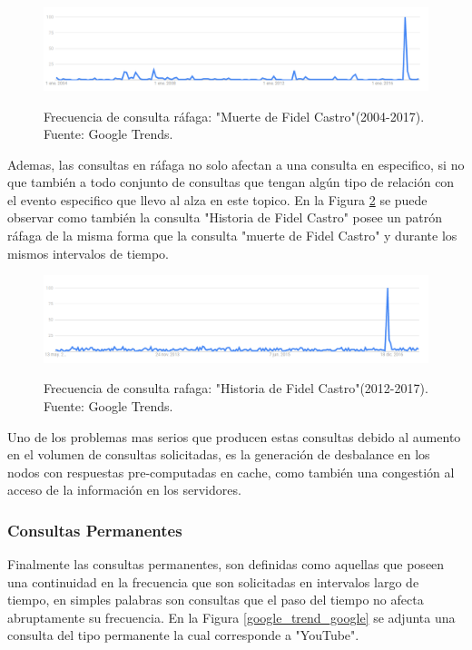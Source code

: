 \documentclass[12pt]{ociamthesis}  %
\begin{document}
\begin{figure}[!htb]
	\centering
	\includegraphics[width=15cm]{muerte_fidel_castro.png}\\
	\caption{Frecuencia de consulta ráfaga: "Muerte de Fidel Castro"(2004-2017). Fuente: Google Trends.}
	\label{google_trend_muerte_Fidel_Cast}
\end{figure}

Ademas, las consultas en ráfaga no solo afectan a una consulta en especifico, si no que también a todo conjunto de consultas que tengan algún tipo de relación con el evento especifico que llevo al alza en este topico. En la Figura \ref{google_trend_histo_Fidel_Cas} se puede observar como también la consulta "Historia de Fidel Castro" posee un patrón ráfaga de la misma forma que la consulta "muerte de Fidel Castro" y durante los mismos intervalos de tiempo.\\

\begin{figure}[!htb]
	\centering
	\includegraphics[width=15cm]{historia_Fidel_Castro.png}\\
	\caption{Frecuencia de consulta rafaga: "Historia de Fidel Castro"(2012-2017). Fuente: Google Trends.}
	\label{google_trend_histo_Fidel_Cas}
\end{figure}

Uno de los problemas mas serios que producen estas consultas debido al aumento en el volumen de consultas solicitadas, es la generación de desbalance en los nodos con respuestas pre-computadas en cache, como también una congestión al acceso de la información en los servidores.\\

\subsubsection{Consultas Permanentes}
Finalmente las consultas permanentes, son definidas como aquellas que poseen una continuidad en la frecuencia que son solicitadas en intervalos largo de tiempo, en simples palabras son consultas que el paso del tiempo no afecta abruptamente su frecuencia. En la Figura \ref{google_trend_google} se adjunta una consulta del tipo permanente la cual corresponde a "YouTube".\\
\end{document}
